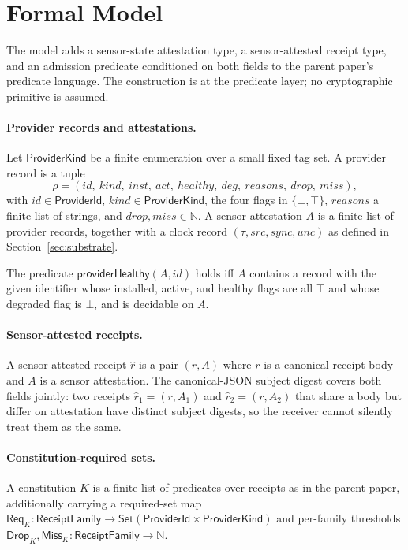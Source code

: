 \section{Formal Model}
\label{sec:model}

The model adds a sensor-state attestation type, a sensor-attested receipt type, and an admission predicate conditioned on both fields to the parent paper's predicate language. The construction is at the predicate layer; no cryptographic primitive is assumed.

\paragraph{Provider records and attestations.}
Let $\mathsf{ProviderKind}$ be a finite enumeration over a small fixed tag set. A provider record is a tuple
\[
  \rho = (\mathit{id},\ \mathit{kind},\ \mathit{inst},\ \mathit{act},\ \mathit{healthy},\ \mathit{deg},\ \mathit{reasons},\ \mathit{drop},\ \mathit{miss}),
\]
with $\mathit{id} \in \mathsf{ProviderId}$, $\mathit{kind} \in \mathsf{ProviderKind}$, the four flags in $\{\bot,\top\}$, $\mathit{reasons}$ a finite list of strings, and $\mathit{drop}, \mathit{miss} \in \mathbb{N}$. A sensor attestation $A$ is a finite list of provider records, together with a clock record $(\tau, \mathit{src}, \mathit{sync}, \mathit{unc})$ as defined in Section~\ref{sec:substrate}.

The predicate $\mathsf{providerHealthy}(A, \mathit{id})$ holds iff $A$ contains a record with the given identifier whose installed, active, and healthy flags are all $\top$ and whose degraded flag is $\bot$, and is decidable on $A$.

\paragraph{Sensor-attested receipts.}
A sensor-attested receipt $\hat r$ is a pair $(r, A)$ where $r$ is a canonical receipt body and $A$ is a sensor attestation. The canonical-JSON subject digest covers both fields jointly: two receipts $\hat r_1 = (r, A_1)$ and $\hat r_2 = (r, A_2)$ that share a body but differ on attestation have distinct subject digests, so the receiver cannot silently treat them as the same.

\paragraph{Constitution-required sets.}
A constitution $K$ is a finite list of predicates over receipts as in the parent paper, additionally carrying a required-set map $\mathsf{Req}_K : \mathsf{ReceiptFamily} \to \mathsf{Set}(\mathsf{ProviderId} \times \mathsf{ProviderKind})$ and per-family thresholds $\mathsf{Drop}_K, \mathsf{Miss}_K : \mathsf{ReceiptFamily} \to \mathbb{N}$.

